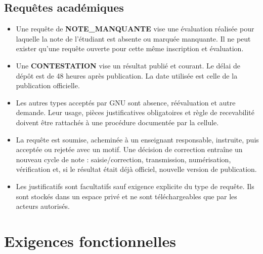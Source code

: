 \documentclass[11pt,a4paper]{article}
\begin{document}
\subsection{Requêtes académiques}
\begin{itemize}
  \item Une requête de \textbf{NOTE\_MANQUANTE} vise une évaluation réalisée pour laquelle la note de l'étudiant est absente ou marquée manquante. Il ne peut exister qu'une requête ouverte pour cette même inscription et évaluation.
  \item Une \textbf{CONTESTATION} vise un résultat publié et courant. Le délai de dépôt est de 48 heures après publication. La date utilisée est celle de la publication officielle.
  \item Les autres types acceptés par GNU sont absence, réévaluation et autre demande. Leur usage, pièces justificatives obligatoires et règle de recevabilité doivent être rattachés à une procédure documentée par la cellule.
  \item La requête est soumise, acheminée à un enseignant responsable, instruite, puis acceptée ou rejetée avec un motif. Une décision de correction entraîne un nouveau cycle de note : saisie/correction, transmission, numérisation, vérification et, si le résultat était déjà officiel, nouvelle version de publication.
  \item Les justificatifs sont facultatifs sauf exigence explicite du type de requête. Ils sont stockés dans un espace privé et ne sont téléchargeables que par les acteurs autorisés.
\end{itemize}

\section{Exigences fonctionnelles}
\end{document}
